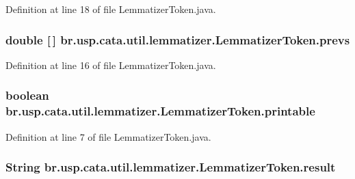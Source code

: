 Definition at line 18 of file Lemmatizer\+Token.\+java.

\hypertarget{classbr_1_1usp_1_1cata_1_1util_1_1lemmatizer_1_1_lemmatizer_token_a22a5ee0e4f6b768ed58e5ffb7c191289}{
\subsubsection[{prevs}]{\setlength{\rightskip}{0pt plus 5cm}double \mbox{[}$\,$\mbox{]} br.\+usp.\+cata.\+util.\+lemmatizer.\+Lemmatizer\+Token.\+prevs\hspace{0.3cm}{\ttfamily [private]}}}\label{classbr_1_1usp_1_1cata_1_1util_1_1lemmatizer_1_1_lemmatizer_token_a22a5ee0e4f6b768ed58e5ffb7c191289}


Definition at line 16 of file Lemmatizer\+Token.\+java.

\hypertarget{classbr_1_1usp_1_1cata_1_1util_1_1lemmatizer_1_1_lemmatizer_token_a00fe0df36c0a9f75ebd37bbe15b7e6f0}{
\subsubsection[{printable}]{\setlength{\rightskip}{0pt plus 5cm}boolean br.\+usp.\+cata.\+util.\+lemmatizer.\+Lemmatizer\+Token.\+printable\hspace{0.3cm}{\ttfamily [private]}}}\label{classbr_1_1usp_1_1cata_1_1util_1_1lemmatizer_1_1_lemmatizer_token_a00fe0df36c0a9f75ebd37bbe15b7e6f0}


Definition at line 7 of file Lemmatizer\+Token.\+java.

\hypertarget{classbr_1_1usp_1_1cata_1_1util_1_1lemmatizer_1_1_lemmatizer_token_a535b666da5f81475704586f61173323b}{
\subsubsection[{result}]{\setlength{\rightskip}{0pt plus 5cm}String br.\+usp.\+cata.\+util.\+lemmatizer.\+Lemmatizer\+Token.\+result\hspace{0.3cm}{\ttfamily [private]}}}\label{classbr_1_1usp_1_1cata_1_1util_1_1lemmatizer_1_1_lemmatizer_token_a535b666da5f81475704586f61173323b}


